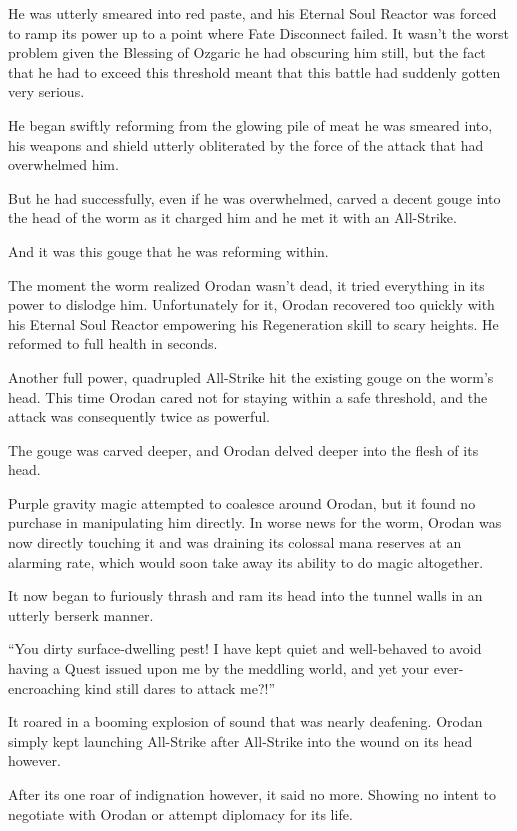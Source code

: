 \documentclass[a4paper,10pt]{book}
\begin{document}
He was utterly smeared into red paste, and his Eternal Soul Reactor was forced to ramp its power up to a point where Fate Disconnect failed. It wasn’t the worst problem given the Blessing of Ozgaric he had obscuring him still, but the fact that he had to exceed this threshold meant that this battle had suddenly gotten very serious.\par
He began swiftly reforming from the glowing pile of meat he was smeared into, his weapons and shield utterly obliterated by the force of the attack that had overwhelmed him.\par
But he had successfully, even if he was overwhelmed, carved a decent gouge into the head of the worm as it charged him and he met it with an All-Strike.\par
And it was this gouge that he was reforming within.\par
The moment the worm realized Orodan wasn’t dead, it tried everything in its power to dislodge him. Unfortunately for it, Orodan recovered too quickly with his Eternal Soul Reactor empowering his Regeneration skill to scary heights. He reformed to full health in seconds.\par
Another full power, quadrupled All-Strike hit the existing gouge on the worm’s head. This time Orodan cared not for staying within a safe threshold, and the attack was consequently twice as powerful.\par
The gouge was carved deeper, and Orodan delved deeper into the flesh of its head.\par
Purple gravity magic attempted to coalesce around Orodan, but it found no purchase in manipulating him directly. In worse news for the worm, Orodan was now directly touching it and was draining its colossal mana reserves at an alarming rate, which would soon take away its ability to do magic altogether.\par
It now began to furiously thrash and ram its head into the tunnel walls in an utterly berserk manner.\par
“You dirty surface-dwelling pest! I have kept quiet and well-behaved to avoid having a Quest issued upon me by the meddling world, and yet your ever-encroaching kind still dares to attack me?!”\par
It roared in a booming explosion of sound that was nearly deafening. Orodan simply kept launching All-Strike after All-Strike into the wound on its head however.\par
After its one roar of indignation however, it said no more. Showing no intent to negotiate with Orodan or attempt diplomacy for its life.\par
\end{document}
